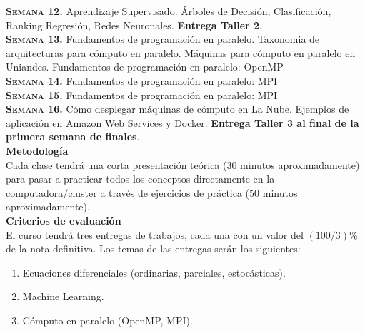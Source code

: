 \documentclass[letterpaper,10pt,onecolumn]{article}
\begin{document}
\noindent\textbf{\textsc{Semana 12.}}  
Aprendizaje Supervisado. Árboles de Decisión, Clasificación, Ranking
Regresión, Redes Neuronales. 
{\bf Entrega Taller 2}.
\\[-0.3cm]  

\noindent\textbf{\textsc{Semana 13.}} 
Fundamentos de programaci\'on en paralelo. Taxonomia de arquitecturas
para c\'omputo en paralelo. M\'aquinas para c\'omputo en paralelo en
Uniandes. 
Fundamentos de programaci\'on en paralelo: OpenMP
\\[-0.3cm]  

\noindent\textbf{\textsc{Semana 14.}} 
Fundamentos de programaci\'on en paralelo: MPI
\\[-0.3cm] 

\noindent\textbf{\textsc{Semana 15.}} 
Fundamentos de programaci\'on en paralelo: MPI
\\[-0.3cm] 

\noindent\textbf{\textsc{Semana 16.}} 
C\'omo desplegar m\'aquinas de c\'omputo en La Nube. Ejemplos de
aplicaci\'on en Amazon Web Services y Docker.  {\bf Entrega Taller 3 al final de la primera semana de finales}.
\\[-0.1cm]  


\noindent\textbf{\large {} \quad
  Metodolog\'ia}\\[-0.2cm] 


\noindent\normalsize Cada clase tendr\'a una corta presentaci\'on
te\'orica (30 minutos aproximadamente) para pasar a practicar todos
los conceptos directamente en la computadora/cluster a trav\'es de
ejercicios de pr\'actica (50 minutos aproximadamente). \\[0.1cm]


\noindent\textbf{\large {} \quad Criterios de
  evaluaci\'on}\\[-0.2cm] 


El curso tendr\'a tres entregas de trabajos, cada una con un valor
del $(100/3) \%$ de la nota definitiva. Los temas de las entregas ser\'an
los siguientes:
\begin{enumerate}
\item Ecuaciones diferenciales (ordinarias, parciales, estoc\'asticas).
\\[-0.6cm]
\item Machine Learning.
\\[-0.6cm]
\item C\'omputo en paralelo (OpenMP, MPI).
\\[-0.2cm]
\end{enumerate}
\end{document}
